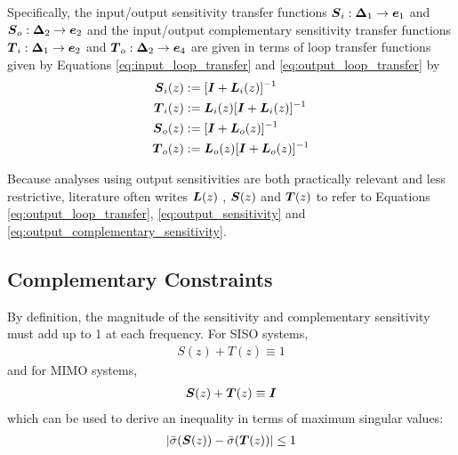 Specifically, the input/output sensitivity transfer functions $\vb*{S}_{i}: \vb*{\Delta}_{1} \rightarrow \vb*{e}_{1}$ and $\vb*{S}_{o}: \vb*{\Delta}_{2} \rightarrow \vb*{e}_{2}$ and the input/output complementary sensitivity transfer functions $\vb*{T}_{i}: \vb*{\Delta}_{1} \rightarrow \vb*{e}_{2}$ and $\vb*{T}_{o}: \vb*{\Delta}_{2} \rightarrow \vb*{e}_{4}$ are given in terms of loop transfer functions given by Equations \eqref{eq:input_loop_transfer} and \eqref{eq:output_loop_transfer} by
\begin{subequations}
\label{eq:input_output_sensitivities}
\begin{align}
	\vb*{S}_{i}(z) &:= [\vb*{I} + \vb*{L}_{i}(z)]^{-1} \label{eq:input_sensitivity}\\
	\vb*{T}_{i}(z) &:= \vb*{L}_{i}(z)[\vb*{I} + \vb*{L}_{i}(z)]^{-1} \label{eq:input_complementary_sensitivity}\\
	\vb*{S}_{o}(z) &:= [\vb*{I} + \vb*{L}_{o}(z)]^{-1} \label{eq:output_sensitivity}\\
	\vb*{T}_{o}(z) &:= \vb*{L}_{o}(z)[\vb*{I} + \vb*{L}_{o}(z)]^{-1} \label{eq:output_complementary_sensitivity}
\end{align}
\end{subequations}

Because analyses using output sensitivities are both practically relevant and less restrictive, literature often writes $\vb*{L}(z)$ , $\vb*{S}(z)$ and $\vb*{T}(z)$ to refer to Equations \eqref{eq:output_loop_transfer}, \eqref{eq:output_sensitivity} and \eqref{eq:output_complementary_sensitivity}.

\subsection{Complementary Constraints}
By definition, the magnitude of the sensitivity and complementary sensitivity must add up to 1 at each frequency.  For SISO systems,
\begin{equation}
\label{eq:T_S_I}
\begin{aligned}
	S(z) + T(z) \equiv 1
\end{aligned}
\end{equation}
and for MIMO systems,
\begin{equation}
\label{eq:T_S_I_mimo}
\begin{aligned}
	\vb*{S}(z) + \vb*{T}(z) \equiv \vb*{I}
\end{aligned}
\end{equation}
which can be used to derive an inequality in terms of maximum singular values:
\begin{equation}
\begin{aligned}
	|\bar{\sigma}(\vb*{S}(z)) - \bar{\sigma}(\vb*{T}(z))| \leq 1
\end{aligned}
\end{equation}

